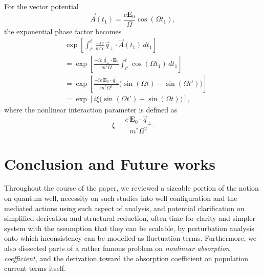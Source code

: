 \documentclass[%
 reprint,
 amsmath,amssymb,
 aps,
]{revtex4-2}
\begin{document}
For the vector potential
\begin{equation}
\vec{A}(t_{1})
=
\frac{c\mathbf{E}_{0}}{\Omega}
\cos(\Omega t_{1}),
\end{equation}
the exponential phase factor becomes
\begin{equation}
\begin{aligned}
&\exp\left[
\int_{t'}^{t}
\frac{-ie}{m^{*}c}
\vec{q}_{\perp}
\cdot
\vec{A}(t_{1})
\, dt_{1}
\right]\\
&=
\exp\left[
\frac{-ie\,\vec{q}_{\perp}\cdot\mathbf{E}_{0}}
{m^{*}\Omega}
\int_{t'}^{t}
\cos(\Omega t_{1})
\, dt_{1}
\right]
\\
&=
\exp\left[
\frac{-ie\,\mathbf{E}_{0}\cdot\vec{q}_{\perp}}
{m^{*}\Omega^{2}}
\big(
\sin(\Omega t)
-
\sin(\Omega t')
\big)
\right]
\\
&=
\exp\left[
i\xi
\big(
\sin(\Omega t')
-
\sin(\Omega t)
\big)
\right],
\end{aligned}
\end{equation}
where the nonlinear interaction parameter is defined as
\begin{equation}
\xi
=
\frac{e\,\mathbf{E}_{0}\cdot\vec{q}_{\perp}}
{m^{*}\Omega^{2}}.
\end{equation}
\section{Conclusion and Future works}
Throughout the course of the paper, we reviewed a sizeable portion of the notion on quantum well, necessity on such studies into well configuration and the mediated actions using such aspect of analysis, and potential clarification on simplified derivation and structural reduction, often time for clarity and simpler system with the assumption that they can be scalable, by perturbation analysis onto which inconsistency can be modelled as fluctuation terms. Furthermore, we also dissected parts of a rather famous problem on \textit{nonlinear absorption coefficient}, and the derivation toward the absorption coefficient on population current terms itself. 
\end{document}
